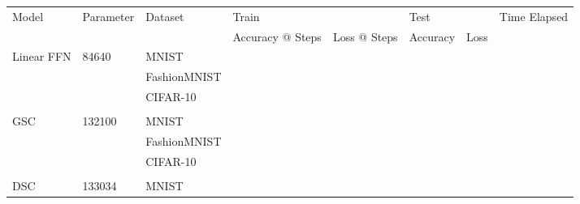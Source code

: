 \documentclass{article}
\begin{document}
\begin{table}[]
\centering
\begin{tabular}{@{}llllllll@{}}
\toprule
\multirow{2}{*}{Model}      & \multirow{2}{*}{Parameter} & \multirow{2}{*}{Dataset} & \multicolumn{2}{l}{Train}       & \multicolumn{2}{l}{Test} & \multirow{2}{*}{Time Elapsed} \\ \cmidrule(lr){4-7}
                            &                            &                          & Accuracy @ Steps & Loss @ Steps & Accuracy      & Loss     &                               \\ \cmidrule(r){1-3} \cmidrule(l){8-8} 
\multirow{3}{*}{Linear FFN} & \multirow{3}{*}{84640}     & MNIST                    &                  &              &               &          &                               \\
                            &                            & FashionMNIST             &                  &              &               &          &                               \\
                            &                            & CIFAR-10                 &                  &              &               &          &                               \\
                            &                            &                          &                  &              &               &          &                               \\
GSC                         & 132100                     & MNIST                    &                  &              &               &          &                               \\
                            &                            & FashionMNIST             &                  &              &               &          &                               \\
                            &                            & CIFAR-10                 &                  &              &               &          &                               \\
                            &                            &                          &                  &              &               &          &                               \\
DSC                         & 133034                     & MNIST                    &                  &              &               &          &                               \\

\end{tabular}
\end{table}
\end{document}
